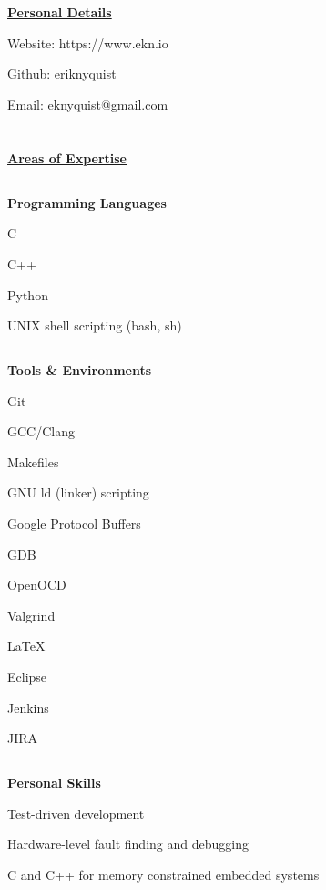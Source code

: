 \documentclass[6pt]{article}
\begin{document}
%
%
\hspace*{-\parindent}%
\begin{minipage}{15em}
\section*{}
{\underline{\textbf{Personal Details}}}
\break

{\small Website: https://www.ekn.io

Github: eriknyquist

Email: eknyquist@gmail.com}

\section*{}
{\underline{\textbf{Areas of Expertise}}}
\subsection*{}
{\textbf{Programming Languages}}

{\small C

C++

Python

UNIX shell scripting (bash, sh)}

\subsection*{}
{\textbf{Tools \& Environments}}

{\small Git

GCC/Clang

Makefiles

GNU ld (linker) scripting

Google Protocol Buffers

GDB

OpenOCD

Valgrind

LaTeX

Eclipse

Jenkins

JIRA}

\subsection*{}
{\textbf{Personal Skills}}

\noindent
\begin{itemize}
{\small
    \item Test-driven development
    \item Hardware-level fault finding and debugging
    \item C and C++ for memory constrained embedded systems
}
\end{itemize}

\end{minipage}
\end{document}
